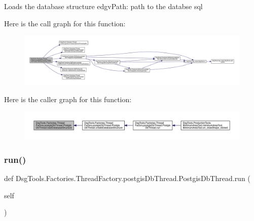 \begin{DoxyVerb}Loads the database structure
edgvPath: path to the databse sql
\end{DoxyVerb}
 Here is the call graph for this function\+:
\nopagebreak
\begin{figure}[H]
\begin{center}
\leavevmode
\includegraphics[width=350pt]{class_dsg_tools_1_1_factories_1_1_thread_factory_1_1postgis_db_thread_1_1_postgis_db_thread_af5c5bd0603c93b226b72ba5a2c467c96_cgraph}
\end{center}
\end{figure}
Here is the caller graph for this function\+:
\nopagebreak
\begin{figure}[H]
\begin{center}
\leavevmode
\includegraphics[width=350pt]{class_dsg_tools_1_1_factories_1_1_thread_factory_1_1postgis_db_thread_1_1_postgis_db_thread_af5c5bd0603c93b226b72ba5a2c467c96_icgraph}
\end{center}
\end{figure}
\mbox{\label{class_dsg_tools_1_1_factories_1_1_thread_factory_1_1postgis_db_thread_1_1_postgis_db_thread_a314b36ebbaa664e125320406c8121091}} 
\subsubsection{\texorpdfstring{run()}{run()}}
{\footnotesize\ttfamily def Dsg\+Tools.\+Factories.\+Thread\+Factory.\+postgis\+Db\+Thread.\+Postgis\+Db\+Thread.\+run (\begin{DoxyParamCaption}\item[{}]{self }\end{DoxyParamCaption})}

